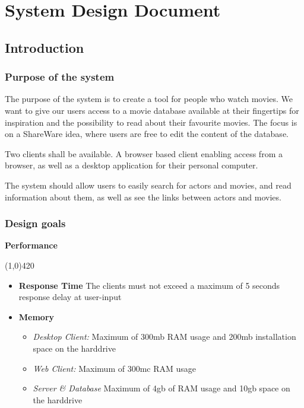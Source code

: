 \chapter{System Design Document}

\section{Introduction}
\label{sec:introduction}


\subsection{Purpose of the system}
The purpose of the system is to create a tool for people who watch movies. We want to give our users access to a movie database available at their fingertips for inspiration and the possibility to read about their favourite movies. The focus is on a ShareWare idea, where users are free to edit the content of the database.

Two clients shall be available. A browser based client enabling access from a browser, as well as a desktop application for their personal computer.  

The system should allow users to easily search for actors and movies, and read information about them, as well as see the links between actors and movies.




\subsection{Design goals}

\textbf{Performance}
\vspace{-1.1cm}
\begin{center}
\line(1,0){420}
\end{center}


\begin{itemize}
\item \textbf{Response Time} The clients must not exceed a maximum of 5 seconds response delay at user-input
\item \textbf{Memory} 
\begin{itemize}
\item \emph{Desktop Client:} Maximum of 300mb RAM usage and 200mb installation space on the harddrive
\item \emph{Web Client:} Maximum of 300mc RAM usage
\item \emph{Server \& Database} Maximum of 4gb of RAM usage and 10gb space on the harddrive
\end{itemize}
\end{itemize}

